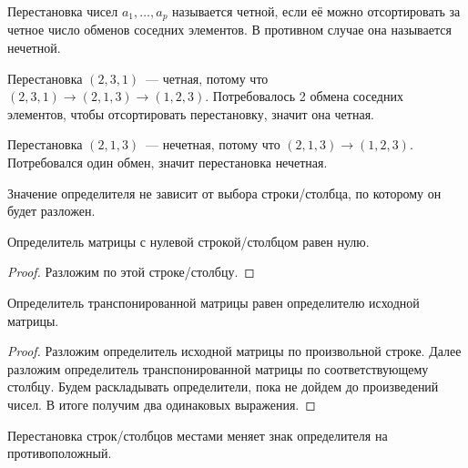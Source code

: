 \begin{remark}
  Перестановка чисел \(a_1, \dotsc, a_p\) называется четной, если её можно
  отсортировать за четное число обменов соседних элементов. В противном случае
  она называется нечетной.
\end{remark}

\begin{example}
  Перестановка \((2, 3, 1)\)~--- четная, потому что \((2, 3, 1) \to (2, 1, 3)
  \to (1, 2, 3)\). Потребовалось 2 обмена соседних элементов, чтобы
  отсортировать перестановку, значит она четная.
  
  Перестановка \((2, 1, 3)\)~--- нечетная, потому что \((2, 1, 3) \to (1, 2,
  3)\). Потребовался один обмен, значит перестановка нечетная.
\end{example}

\begin{theorem}
  Значение определителя не зависит от выбора строки/столбца, по которому он
  будет разложен.
\end{theorem}

\begin{theorem}
  Определитель матрицы с нулевой строкой/столбцом равен нулю.
\end{theorem}

\begin{proof}
  Разложим по этой строке/столбцу.
\end{proof}

\begin{theorem}
  Определитель транспонированной матрицы равен определителю исходной матрицы.
\end{theorem}

\begin{proof}
  Разложим определитель исходной матрицы по произвольной строке. Далее разложим
  определитель транспонированной матрицы по соответствующему столбцу. Будем
  раскладывать определители, пока не дойдем до произведений чисел. В итоге
  получим два одинаковых выражения.
\end{proof}

\begin{theorem} \label{thr:det-swap}
  Перестановка строк/столбцов местами меняет знак определителя на
  противоположный.
\end{theorem}

